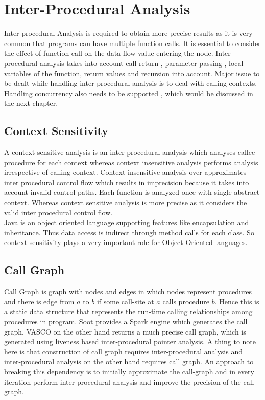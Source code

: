 \chapter{Inter-Procedural Analysis}

Inter-procedural Analysis is required to obtain more precise results as it is very common that programs can have multiple function calls. It is essential to consider the effect of function call on the data flow value entering the node. Inter-procedural analysis takes into account call return , parameter passing , local variables of the function, return values and recursion into account. Major issue to be dealt while handling inter-procedural analysis is to deal with calling contexts. Handling concurrency also needs to be supported , which would be discussed in the next chapter. \\


\section{Context Sensitivity}
A context sensitive analysis is an inter-procedural analysis which analyses callee procedure for each context whereas context insensitive analysis performs analysis irrespective of calling context. Context insensitive analysis over-approximates inter procedural control flow which results in imprecision because it takes into account invalid control paths. Each function is analyzed once with single abstract context. Whereas context sensitive analysis is more precise as
it considers the valid inter procedural control flow. \\

Java is an object oriented language supporting features like encapsulation and inheritance. Thus data access is indirect through method calls for each class. So context sensitivity plays a very important role for Object Oriented languages.
     
\section{Call Graph}

Call Graph is graph with nodes and edges in which nodes represent procedures and there is edge from $a$ to $b$ if some call-site at $a$ calls procedure
$b$. Hence this is a static data structure that represents the run-time calling relationships among procedures in program. Soot provides a Spark engine which generates the call graph. VASCO on the other hand returns a much precise call graph, which is generated using liveness based inter-procedural pointer analysis. A thing to note here is that construction of call graph requires inter-procedural analysis and inter-procedural analysis on the other hand requires call graph. An approach to breaking this dependency is to initially approximate the call-graph and in every iteration perform inter-procedural analysis and improve the precision of the call graph.\cite{vasco} \\

